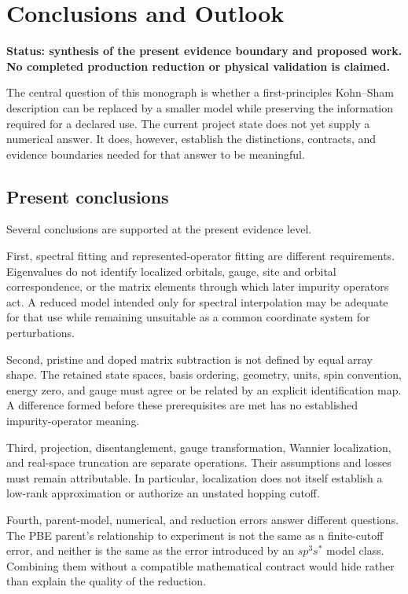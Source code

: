 \chapter{Conclusions and Outlook}
\label{ch:conclusions-and-outlook}

\textbf{Status: synthesis of the present evidence boundary and proposed work.
No completed production reduction or physical validation is claimed.}

The central question of this monograph is whether a first-principles
Kohn--Sham description can be replaced by a smaller model while preserving the
information required for a declared use. The current project state does not yet
supply a numerical answer. It does, however, establish the distinctions,
contracts, and evidence boundaries needed for that answer to be meaningful.

\section{Present conclusions}

Several conclusions are supported at the present evidence level.

First, spectral fitting and represented-operator fitting are different
requirements. Eigenvalues do not identify localized orbitals, gauge, site and
orbital correspondence, or the matrix elements through which later impurity
operators act. A reduced model intended only for spectral interpolation may be
adequate for that use while remaining unsuitable as a common coordinate system
for perturbations.

Second, pristine and doped matrix subtraction is not defined by equal array
shape. The retained state spaces, basis ordering, geometry, units, spin
convention, energy zero, and gauge must agree or be related by an explicit
identification map. A difference formed before these prerequisites are met has
no established impurity-operator meaning.

Third, projection, disentanglement, gauge transformation, Wannier localization,
and real-space truncation are separate operations. Their assumptions and losses
must remain attributable. In particular, localization does not itself establish
a low-rank approximation or authorize an unstated hopping cutoff.

Fourth, parent-model, numerical, and reduction errors answer different
questions. The PBE parent's relationship to experiment is not the same as a
finite-cutoff error, and neither is the same as the error introduced by an
$sp^3s^{\ast}$ model class. Combining them without a compatible mathematical
contract would hide rather than explain the quality of the reduction.

